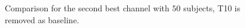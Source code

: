 \documentclass[oneside, a4paper,10pt]{report}
\begin{document}
\begin{landscape}
\begin{figure}[H]
\begin{tikzpicture}
  \end{tikzpicture}
  \caption{Comparison for the second best channel with $50$ subjects, T10 is removed as baseline.}
  \label{fg:2Ch_S50_B1_RA}
\end{figure}

\end{landscape}
\end{document}
